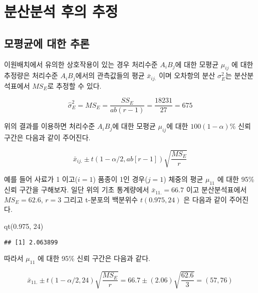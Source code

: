 \documentclass[
]{book}
\newenvironment{Shaded}{\begin{snugshade}}{\end{snugshade}}
\newcommand{\DecValTok}[1]{\textcolor[rgb]{0.00,0.00,0.81}{#1}}
\newcommand{\FloatTok}[1]{\textcolor[rgb]{0.00,0.00,0.81}{#1}}
\newcommand{\FunctionTok}[1]{\textcolor[rgb]{0.00,0.00,0.00}{#1}}
\newcommand{\NormalTok}[1]{#1}
\begin{document}
\hypertarget{uxbd84uxc0b0uxbd84uxc11d-uxd6c4uxc758-uxcd94uxc815-1}{%
\section{분산분석 후의 추정}\label{uxbd84uxc0b0uxbd84uxc11d-uxd6c4uxc758-uxcd94uxc815-1}}

\hypertarget{uxbaa8uxd3c9uxade0uxc5d0-uxb300uxd55c-uxcd94uxb860-1}{%
\subsection{모평균에 대한 추론}\label{uxbaa8uxd3c9uxade0uxc5d0-uxb300uxd55c-uxcd94uxb860-1}}

이원배치에서 유의한 상호작용이 있는 경우 처리수준 \(A_iB_j\)에 대한 모평균 \(\mu_{ij}\) 에 대한 추정량은 처리수준 \(A_iB_j\)에서의 관측값들의 평균 \(\bar {x}_{ij.}\) 이며 오차항의 분산 \(\sigma^2_E\)는 분산분석표에서 \(MS_E\)로 추정할 수 있다.

\[ \hat \sigma^2_E = MS_E = \frac{SS_E}{ab(r-1)} =\frac{18231}{27} = 675 \]

위의 결과를 이용하면 처리수준 \(A_iB_j\)에 대한 모평균 \(\mu_{ij}\)에 대한 \(100(1-\alpha)\)\% 신뢰구간은 다음과 같이 주어진다.

\[ \bar x_{ij.} \pm t(1-\alpha/2, ab[r-1]) \sqrt{ \frac{MS_E}{r}} \]

예를 들어 사료가 1 이고(\(i=1\)) 품종이 1인 경우(\(j=1\)) 체중의 평균 \(\mu_{11}\) 에 대한 95\% 신뢰 구간을 구해보자. 일단 위의 기초 통계량에서 \(\bar x_{11.}=66.7\) 이고 분산분석표에서 \(MS_E =62.6\), \(r=3\) 그리고 t-분포의 백분위수 \(t(0.975, 24)\) 은 다음과 같이 주어진다.

\begin{Shaded}
\begin{Highlighting}[]
\FunctionTok{qt}\NormalTok{(}\FloatTok{0.975}\NormalTok{, }\DecValTok{24}\NormalTok{)}
\end{Highlighting}
\end{Shaded}

\begin{verbatim}
## [1] 2.063899
\end{verbatim}

따라서 \(\mu_{11}\) 에 대한 95\% 신뢰 구간은 다음과 같다.

\begin{equation}
\bar x_{11.} \pm t(1-\alpha/2, 24) \sqrt{ \frac{MS_E}{r}} = 66.7 \pm (2.06)\sqrt{\frac{62.6}{3}} = (57, 76) 
\label{eq:confint}
\end{equation}
\end{document}
